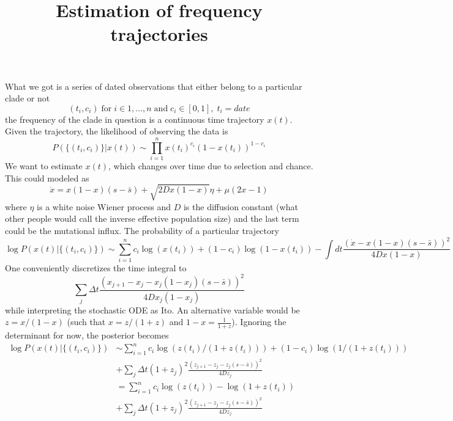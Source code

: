 \documentclass[11pt]{article}
\title{Estimation of frequency trajectories}
\begin{document}
\maketitle
What we got is a series of dated observations that either belong to a particular clade or not
\begin{equation}
    (t_i, c_i) \; \mathrm{for}\; i\in 1,\ldots,n \; \mathrm{and}\; c_i\in[0,1],\; t_i = date
\end{equation}
the frequency of the clade in question is a continuous time trajectory $x(t)$. Given the 
trajectory, the likelihood of observing the data is
\begin{equation}
    P(\{(t_i, c_i)\}|x(t)) \sim \prod_{i=1}^n x(t_i)^{c_i}(1-x(t_i))^{1-c_i}
\end{equation}
We want to estimate $x(t)$, which changes over time due to selection and chance. This could 
modeled as 
\begin{equation}
    \dot{x} = x(1-x) (s-\bar{s}) + \sqrt{2Dx(1-x)}\eta + \mu(2x-1)
\end{equation}
where $\eta$ is a white noise Wiener process and $D$ is the diffusion constant (what other 
people would call the inverse effective population size) and the last term could be 
the mutational influx. The probability of a particular trajectory 
\begin{equation}
    \log P(x(t) | \{(t_i, c_i)\} ) \sim \sum_{i=1}^n c_i\log(x(t_i)) + (1-c_i)\log(1-x(t_i))
     - \int dt \frac{(\dot{x}-x(1-x)(s-\bar{s}))^2}{4Dx(1-x)}
\end{equation}
One conveniently discretizes the time integral to 
\begin{equation}
    \sum_j \Delta t \frac{(x_{j+1}-x_j-x_j(1-x_j)(s-\bar{s}))^2}{4Dx_j(1-x_j)} 
\end{equation}
while interpreting the stochastic ODE as Ito.
An alternative variable would be $z = x/(1-x)$ (such that $x = z/(1+z)$ and 
$1-x = \frac{1}{1+z}$). Ignoring the determinant for now, the posterior becomes
\begin{equation}
\begin{split}
    \log P(x(t) | \{(t_i, c_i)\} ) & \sim \sum_{i=1}^n c_i\log(z(t_i)/(1+z(t_i))) + (1-c_i)\log(1/(1+z(t_i)))\\
    &+\sum_j \Delta t (1+z_j)^2\frac{(z_{j+1}-z_j-z_j(s-\bar{s}))^2}{4Dz_j}     \\
    &=\sum_{i=1}^n c_i\log(z(t_i)) - \log(1+z(t_i))\\
    &+\sum_j \Delta t (1+z_j)^2\frac{(z_{j+1}-z_j-z_j(s-\bar{s}))^2}{4Dz_j} 
\end{split}
\end{equation}
\end{document}
